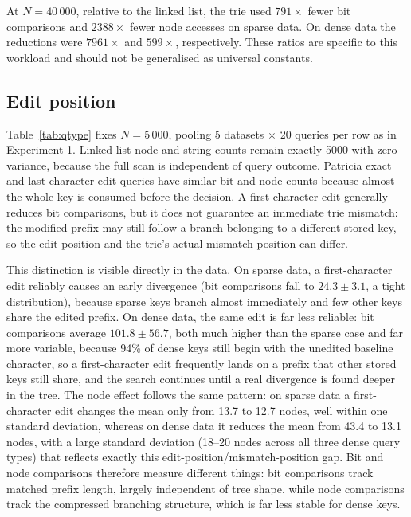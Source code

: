 \documentclass[10pt]{article}
\begin{document}
At $N=40\,000$, relative to the linked list, the trie used $791\times$ fewer bit
comparisons and $2388\times$ fewer node accesses on sparse data. On dense data the
reductions were $7961\times$ and $599\times$, respectively. These ratios are specific to
this workload and should not be generalised as universal constants.

\FloatBarrier
\subsection{Edit position}
\label{sec:qtype}

Table~\ref{tab:qtype} fixes $N=5\,000$, pooling 5 datasets $\times$ 20 queries per row as
in Experiment 1. Linked-list node and string counts remain exactly 5000 with zero
variance, because the full scan is independent of query outcome. Patricia exact and
last-character-edit queries have similar bit and node counts because almost the whole key
is consumed before the decision. A first-character edit generally reduces bit
comparisons, but it does not guarantee an immediate trie mismatch: the modified prefix
may still follow a branch belonging to a different stored key, so the edit position and
the trie's actual mismatch position can differ.

This distinction is visible directly in the data. On sparse data, a first-character edit
reliably causes an early divergence (bit comparisons fall to $24.3\pm3.1$, a tight
distribution), because sparse keys branch almost immediately and few other keys share the
edited prefix. On dense data, the same edit is far less reliable: bit comparisons average
$101.8\pm56.7$, both much higher than the sparse case and far more variable, because 94\%
of dense keys still begin with the unedited baseline character, so a first-character edit
frequently lands on a prefix that other stored keys still share, and the search continues
until a real divergence is found deeper in the tree. The node effect follows the same
pattern: on sparse data a first-character edit changes the mean only from 13.7 to 12.7
nodes, well within one standard deviation, whereas on dense data it reduces the mean from
43.4 to 13.1 nodes, with a large standard deviation (18--20 nodes across all three dense
query types) that reflects exactly this edit-position/mismatch-position gap. Bit and node
comparisons therefore measure different things: bit comparisons track matched prefix
length, largely independent of tree shape, while node comparisons track the compressed
branching structure, which is far less stable for dense keys.
\end{document}
